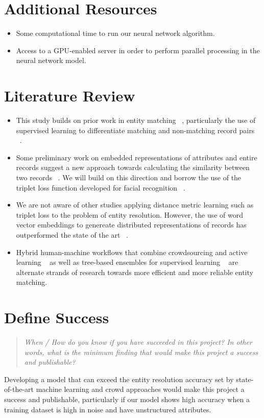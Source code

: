 \documentclass{proc}
\begin{document}
\section{Additional Resources}

\begin{itemize}
  \item Some computational time to run our neural network algorithm.
  \item Access to a GPU-enabled server in order to perform parallel processing in the neural network model. 
\end{itemize}
 
\section{Literature Review}

\begin{itemize}
\item This study builds on prior work in entity matching ~\cite{elmagarmid2007duplicate}, particularly the use of supervised learning to differentiate matching and non-matching record pairs ~\cite{kopcke2010evaluation}.

\item Some preliminary work on embedded representations of attributes and entire records suggest a new approach towards calculating the similarity between two records ~\cite{ebraheem2017deeper}. We will build on this direction and borrow the use of the triplet loss function developed for facial recognition ~\cite{schroff2015facenet}.

\item We are not aware of other studies applying distance metric learning such as triplet loss to the problem of entity resolution. However, the use of word vector embeddings to genereate distributed representations of records has outperformed the state of the art ~\cite{ebraheem2017deeper}.

\item Hybrid human-machine workflows that combine crowdsourcing and active learning ~\cite{wang2012crowder,gokhale2014corleone} as well as tree-based ensembles for supervised learning ~\cite{varma2017relic} are alternate strands of research towards more efficient and more reliable entity matching.

\end{itemize}


\section{Define Success}
\begin{quote}
\emph{When / How do you know if you have succeeded in this project?
In other words, what is the minimum finding that would make this project a success and publishable?}
\end{quote}

Developing a model that can exceed the entity resolution accuracy set by state-of-the-art machine learning and crowd approaches would make this project a success and publishable, particularly if our model shows high accuracy when a training dataset is high in noise and have unstructured attributes.



\end{document}

